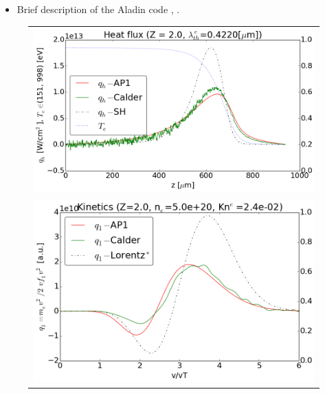 \begin{itemize}
  \item Brief description of the Aladin code , . %
\end{itemize}


\begin{figure}[tbh]
  \begin{center}
    \begin{tabular}{c}
      \includegraphics[width=\figscale\textwidth]{../VFPdata/C7_Calder_case1_heatflux.png} 
	  \\ 
	  \includegraphics[width=\figscale\textwidth]{../VFPdata/C7_Calder_case1_kinetics.png}
	  \\ 

\end{tabular}
\end{center}
\end{figure}
